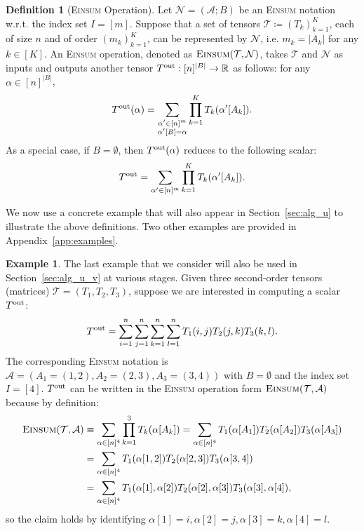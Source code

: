 \documentclass[sn-mathphys, natbib=false]{sn-jnl}
\theoremstyle{plain}
\theoremstyle{definition}
\newtheorem{definition}{Definition}
\newtheorem{example}{Example}
\def\Einsum{\textsc{Einsum}}
\newcommand{\tensorcontraction}{\textsc{Einsum}}
\newcommand{\reals}{{\mathbb{R}}}
\def\calA{\mathcal{A}}
\def\calT{\mathcal{T}}
\def\calN{\mathcal{N}}
\begin{document}
\begin{bibunit}[agsm]
\begin{definition}[\Einsum{} Operation]
\label{def:tensor_contraction}  
Let $\calN = (\calA; B)$ be an \Einsum{} notation w.r.t. the index set $I = [m]$. Suppose that a set of tensors $\calT \coloneqq (T_k)_{k=1}^K$, each of size $n$ and of order $(m_k)_{k = 1}^{K}$, can be represented by $\calN$, i.e. $m_k = |A_k|$ for any $k \in [K]$. An \Einsum{} operation, denoted as $\tensorcontraction(\calT, \calN)$, takes $\calT$ and $\calN$ as inputs and outputs another tensor $T^{\rm out}: [n]^{|B|} \rightarrow \reals$ as follows: for any $\alpha \in [n]^{|B|}$, 
   \begin{align*}
        T^{\rm out} (\alpha) = \sum_{\substack{\alpha^\prime \in [n]^m \\ \alpha'[B] = \alpha}} \prod_{k=1}^K T_k(\alpha^\prime[A_k]).
    \end{align*} 
As a special case, if $B = \emptyset$, then $T^{\rm out} (\alpha)$ reduces to the following scalar:
\begin{align*}
    T^{\rm out} = \sum_{\alpha^\prime \in [n]^m}\prod_{k=1}^K T_k(\alpha^\prime[A_k]).
\end{align*}
\end{definition}

We now use a concrete example that will also appear in Section~\ref{sec:alg_u} to illustrate the above definitions. Two other examples are provided in Appendix~\ref{app:examples}.

\begin{example}
\label{eg:running}
The last example that we consider will also be used in Section~\ref{sec:alg_u_v} at various stages. Given three second-order tensors (matrices) $\calT = (T_1, T_2, T_3)$, suppose we are interested in computing a scalar $T^{\rm out}$:
\begin{align*}
T^{\rm out} = \sum_{i = 1}^{n} \sum_{j = 1}^{n} \sum_{k = 1}^{n} \sum_{l = 1}^{n} T_1 (i, j) T_2 (j, k) T_3 (k, l).
\end{align*}
The corresponding \Einsum{} notation is $\calA = (A_1 = (1, 2), A_2 = (2, 3), A_3 = (3, 4))$ with $B = \emptyset$ and the index set $I = [4]$. $T^{\rm out}$ can be written in the \Einsum{} operation form $\tensorcontraction(\calT, \calA)$ because by definition:
\begin{align*}
\tensorcontraction(\calT, \calA) & \equiv \sum_{\alpha \in [n]^{4}} \prod_{k = 1}^{3} T_{k} (\alpha [A_k]) = \sum_{\alpha \in [n]^{4}} T_1 (\alpha [A_1]) T_2 (\alpha [A_2]) T_3 (\alpha [A_3]) \\
& = \sum_{\alpha \in [n]^{4}} T_1 (\alpha[1, 2]) T_2 (\alpha[2, 3]) T_3 (\alpha[3, 4]) \\
& = \sum_{\alpha \in [n]^{4}} T_1 (\alpha[1], \alpha[2]) T_2 (\alpha[2], \alpha[3]) T_3 (\alpha[3], \alpha[4]),
\end{align*}
so the claim holds by identifying $\alpha [1] = i, \alpha [2] = j, \alpha [3] = k, \alpha [4] = l$.
\end{example}


\end{bibunit}
\end{document}
